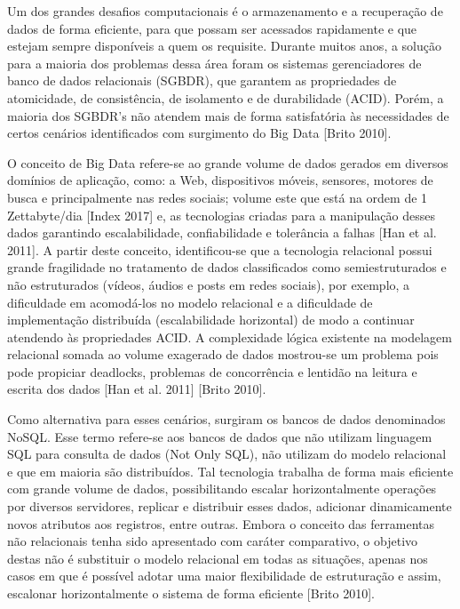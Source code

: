 \documentclass[12pt]{article}
\begin{document}
Um dos grandes desafios computacionais é o armazenamento e a recuperação de dados
de forma eficiente, para que possam ser acessados rapidamente e que estejam sempre disponíveis a quem os requisite. Durante muitos anos, a solução para a maioria dos problemas dessa área foram os sistemas gerenciadores de banco de dados relacionais (SGBDR), que garantem as propriedades de atomicidade, de consistência, de isolamento e de durabilidade (ACID). Porém, a maioria dos SGBDR’s não atendem mais de forma satisfatória às necessidades de certos cenários identificados com surgimento do Big Data [Brito 2010].

O conceito de Big Data refere-se ao grande volume de dados gerados em diversos domínios de aplicação, como: a Web, dispositivos móveis, sensores, motores de busca e principalmente nas redes sociais; volume este que está na ordem de 1 Zettabyte/dia [Index 2017] e, as tecnologias criadas para a manipulação desses dados garantindo escalabilidade, confiabilidade e tolerância a falhas [Han et al. 2011]. A partir deste conceito, identificou-se que a tecnologia relacional possui grande fragilidade no tratamento de dados classificados como semiestruturados e não estruturados (vídeos, áudios e posts em redes sociais), por exemplo, a dificuldade em acomodá-los no modelo relacional e a dificuldade de implementação distribuída (escalabilidade horizontal) de modo a continuar atendendo às propriedades ACID. A complexidade lógica existente na modelagem relacional somada ao volume exagerado de dados mostrou-se um problema pois pode propiciar deadlocks, problemas de concorrência e lentidão na leitura e escrita dos dados [Han et al. 2011] [Brito 2010].

Como alternativa para esses cenários, surgiram os bancos de dados denominados
NoSQL. Esse termo refere-se aos bancos de dados que não utilizam linguagem SQL para consulta de dados (Not Only SQL), não utilizam do modelo relacional e que em maioria são distribuídos. Tal tecnologia trabalha de forma mais eficiente com grande volume de dados, possibilitando escalar horizontalmente operações por diversos servidores, replicar e distribuir esses dados, adicionar dinamicamente novos atributos aos registros, entre outras. Embora o conceito das ferramentas não relacionais tenha sido apresentado com caráter comparativo, o objetivo destas não é substituir o modelo relacional em todas as situações, apenas nos casos em que é possível adotar uma maior flexibilidade de estruturação e assim, escalonar horizontalmente o sistema de forma eficiente [Brito 2010].
\end{document}
